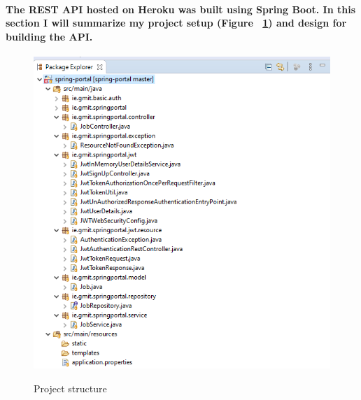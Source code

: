 \paragraph{The REST API hosted on Heroku was built using Spring Boot. In this section I will summarize my project setup (Figure ~\ref{setup_label}) and design for building the API.}
\begin{figure}[ht]
    \centering
    \includegraphics[scale=0.7]{Images/setup.png} 
    \label{setup_label}
    \caption{Project structure}
\end{figure}
